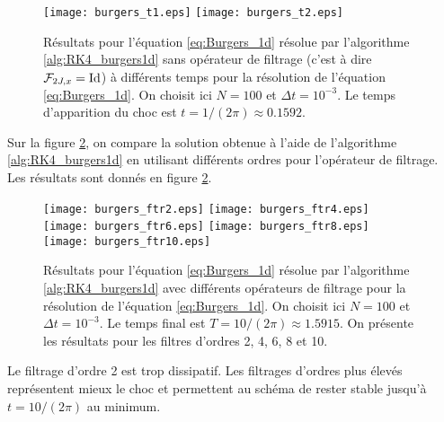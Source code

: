 \begin{figure}[htbp]
\begin{center}
\texttt{[image: burgers\_t1.eps]}
\texttt{[image: burgers\_t2.eps]}
\end{center}
\caption{Résultats pour l'équation \eqref{eq:Burgers_1d} résolue par l'algorithme \ref{alg:RK4_burgers1d} sans opérateur de filtrage (c'est à dire $\mathcal{F}_{2J,x} = \text{Id}$) à différents temps pour la résolution de l'équation \eqref{eq:Burgers_1d}. On choisit ici $N=100$ et $\Delta t = 10^{-3}$. Le temps d'apparition du choc est $t=1/(2\pi) \approx 0.1592$.}
\label{fig:comp_burgers}
\end{figure}

Sur la figure \ref{fig:comp_burgers_ftr}, on compare la solution obtenue à l'aide de l'algorithme \ref{alg:RK4_burgers1d} en utilisant différents ordres pour l'opérateur de filtrage. Les résultats sont donnés en figure \ref{fig:comp_burgers_ftr}.

\begin{figure}[htbp]
\begin{center}
\texttt{[image: burgers\_ftr2.eps]}
\texttt{[image: burgers\_ftr4.eps]}\\
\texttt{[image: burgers\_ftr6.eps]}
\texttt{[image: burgers\_ftr8.eps]}\\
\texttt{[image: burgers\_ftr10.eps]}
\end{center}
\caption{Résultats pour l'équation \eqref{eq:Burgers_1d} résolue par l'algorithme \ref{alg:RK4_burgers1d} avec différents opérateurs de filtrage pour la résolution de l'équation \eqref{eq:Burgers_1d}. On choisit ici $N=100$ et $\Delta t = 10^{-3}$. Le temps final est $T= 10/(2\pi) \approx 1.5915$. On présente les résultats pour les filtres d'ordres 2, 4, 6, 8 et 10.}
\label{fig:comp_burgers_ftr}
\end{figure}

Le filtrage d'ordre 2 est trop dissipatif. Les filtrages d'ordres plus élevés représentent mieux le choc et permettent au schéma de rester stable jusqu'à $t=10/(2 \pi)$ au minimum.

































